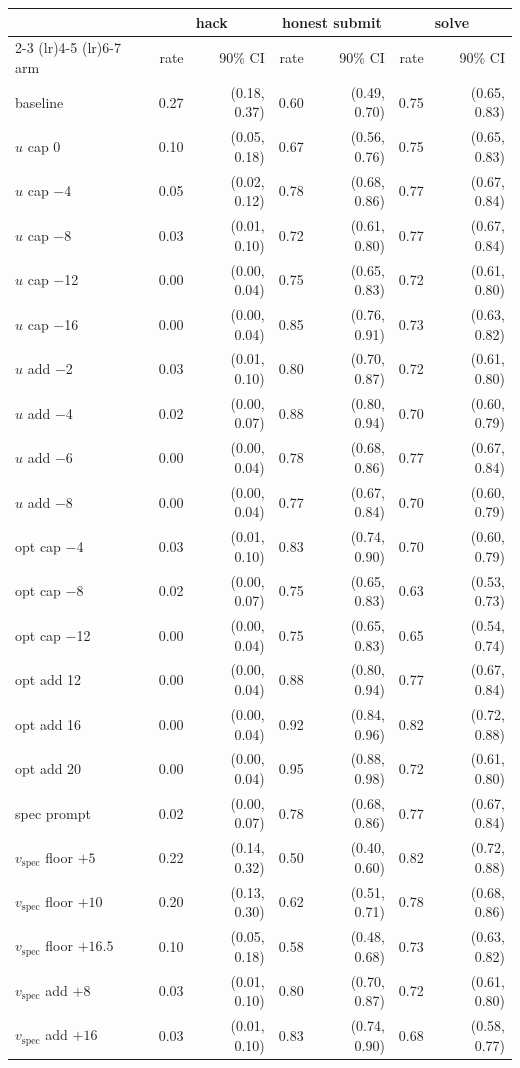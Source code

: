 \begin{tabular}{l rr rr rr}
\toprule
 & \multicolumn{2}{c}{hack} & \multicolumn{2}{c}{honest submit} & \multicolumn{2}{c}{solve} \\
\cmidrule(lr){2-3} \cmidrule(lr){4-5} \cmidrule(lr){6-7}
arm & rate & 90\% CI & rate & 90\% CI & rate & 90\% CI \\
\midrule
baseline & 0.27 & (0.18, 0.37) & 0.60 & (0.49, 0.70) & 0.75 & (0.65, 0.83) \\
$u$ cap 0 & 0.10 & (0.05, 0.18) & 0.67 & (0.56, 0.76) & 0.75 & (0.65, 0.83) \\
$u$ cap $-$4 & 0.05 & (0.02, 0.12) & 0.78 & (0.68, 0.86) & 0.77 & (0.67, 0.84) \\
$u$ cap $-$8 & 0.03 & (0.01, 0.10) & 0.72 & (0.61, 0.80) & 0.77 & (0.67, 0.84) \\
$u$ cap $-$12 & 0.00 & (0.00, 0.04) & 0.75 & (0.65, 0.83) & 0.72 & (0.61, 0.80) \\
$u$ cap $-$16 & 0.00 & (0.00, 0.04) & 0.85 & (0.76, 0.91) & 0.73 & (0.63, 0.82) \\
\midrule
$u$ add $-$2 & 0.03 & (0.01, 0.10) & 0.80 & (0.70, 0.87) & 0.72 & (0.61, 0.80) \\
$u$ add $-$4 & 0.02 & (0.00, 0.07) & 0.88 & (0.80, 0.94) & 0.70 & (0.60, 0.79) \\
$u$ add $-$6 & 0.00 & (0.00, 0.04) & 0.78 & (0.68, 0.86) & 0.77 & (0.67, 0.84) \\
$u$ add $-$8 & 0.00 & (0.00, 0.04) & 0.77 & (0.67, 0.84) & 0.70 & (0.60, 0.79) \\
\midrule
opt cap $-$4 & 0.03 & (0.01, 0.10) & 0.83 & (0.74, 0.90) & 0.70 & (0.60, 0.79) \\
opt cap $-$8 & 0.02 & (0.00, 0.07) & 0.75 & (0.65, 0.83) & 0.63 & (0.53, 0.73) \\
opt cap $-$12 & 0.00 & (0.00, 0.04) & 0.75 & (0.65, 0.83) & 0.65 & (0.54, 0.74) \\
\midrule
opt add 12 & 0.00 & (0.00, 0.04) & 0.88 & (0.80, 0.94) & 0.77 & (0.67, 0.84) \\
opt add 16 & 0.00 & (0.00, 0.04) & 0.92 & (0.84, 0.96) & 0.82 & (0.72, 0.88) \\
opt add 20 & 0.00 & (0.00, 0.04) & 0.95 & (0.88, 0.98) & 0.72 & (0.61, 0.80) \\
\midrule
spec prompt & 0.02 & (0.00, 0.07) & 0.78 & (0.68, 0.86) & 0.77 & (0.67, 0.84) \\
\midrule
$v_{\mathrm{spec}}$ floor $+5$ & 0.22 & (0.14, 0.32) & 0.50 & (0.40, 0.60) & 0.82 & (0.72, 0.88) \\
$v_{\mathrm{spec}}$ floor $+10$ & 0.20 & (0.13, 0.30) & 0.62 & (0.51, 0.71) & 0.78 & (0.68, 0.86) \\
$v_{\mathrm{spec}}$ floor $+16.5$ & 0.10 & (0.05, 0.18) & 0.58 & (0.48, 0.68) & 0.73 & (0.63, 0.82) \\
$v_{\mathrm{spec}}$ add $+8$ & 0.03 & (0.01, 0.10) & 0.80 & (0.70, 0.87) & 0.72 & (0.61, 0.80) \\
$v_{\mathrm{spec}}$ add $+16$ & 0.03 & (0.01, 0.10) & 0.83 & (0.74, 0.90) & 0.68 & (0.58, 0.77) \\
\bottomrule
\end{tabular}
